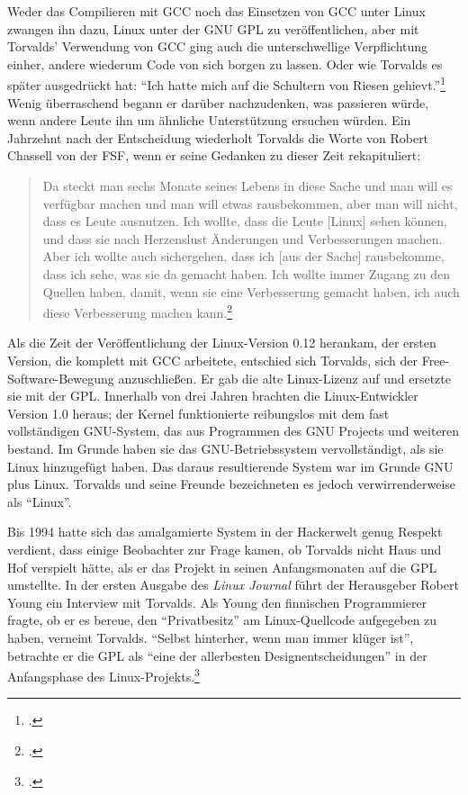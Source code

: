 Weder das Compilieren mit GCC noch das Einsetzen von GCC unter Linux zwangen ihn dazu, Linux unter der GNU GPL zu veröffentlichen, aber mit Torvalds' Verwendung von GCC ging auch die unterschwellige Verpflichtung einher, andere wiederum Code von sich borgen zu lassen. Oder wie Torvalds es später ausgedrückt hat: "`Ich hatte mich auf die Schultern von Riesen gehievt."'\footcite[][S.\,95-97]{tojff} Wenig überraschend begann er darüber nachzudenken, was passieren würde, wenn andere Leute ihn um ähnliche Unterstützung ersuchen würden. Ein Jahrzehnt nach der Entscheidung wiederholt Torvalds die Worte von Robert Chassell von der FSF, wenn er seine Gedanken zu dieser Zeit rekapituliert:

\begin{quote}
Da steckt man sechs Monate seines Lebens in diese Sache und man will es verfügbar machen und man will etwas rausbekommen, aber man will nicht, dass es Leute ausnutzen. Ich wollte, dass die Leute [Linux] sehen können, und dass sie nach Herzenslust Änderungen und Verbesserungen machen. Aber ich wollte auch sichergehen, dass ich [aus der Sache] rausbekomme, dass ich sehe, was sie da gemacht haben. Ich wollte immer Zugang zu den Quellen haben, damit, wenn sie eine Verbesserung gemacht haben, ich auch diese Verbesserung machen kann.\footcite[][S.\,94f]{tojff}
\end{quote}

Als die Zeit der Veröffentlichung der Linux-Version 0.12 herankam, der ersten Version, die komplett mit GCC arbeitete, entschied sich Torvalds, sich der Free-Software-Bewegung anzuschließen. Er gab die alte Linux-Lizenz auf und ersetzte sie mit der GPL. Innerhalb von drei Jahren brachten die Linux-Entwickler Version 1.0 heraus; der Kernel funktionierte reibungslos mit dem fast vollständigen GNU-System, das aus Programmen des GNU Projects und weiteren bestand. Im Grunde haben sie das GNU-Betriebssystem vervollständigt, als sie Linux hinzugefügt haben. Das daraus resultierende System war im Grunde GNU plus Linux. Torvalds und seine Freunde bezeichneten es jedoch verwirrenderweise als "`Linux"'.

Bis 1994 hatte sich das amalgamierte System in der Hackerwelt genug Respekt verdient, dass einige Beobachter zur Frage kamen, ob Torvalds nicht Haus und Hof verspielt hätte, als er das Projekt in seinen Anfangsmonaten auf die GPL umstellte. In der ersten Ausgabe des \textit{Linux Journal} führt der Herausgeber Robert Young ein Interview mit Torvalds. Als Young den finnischen Programmierer fragte, ob er es bereue, den "`Privatbesitz"' am Linux-Quellcode aufgegeben zu haben, verneint Torvalds. "`Selbst hinterher, wenn man immer klüger ist"', betrachte er die GPL als "`eine der allerbesten Designentscheidungen"' in der Anfangsphase des Linux-Projekts.\footcite[][]{yiwto}

